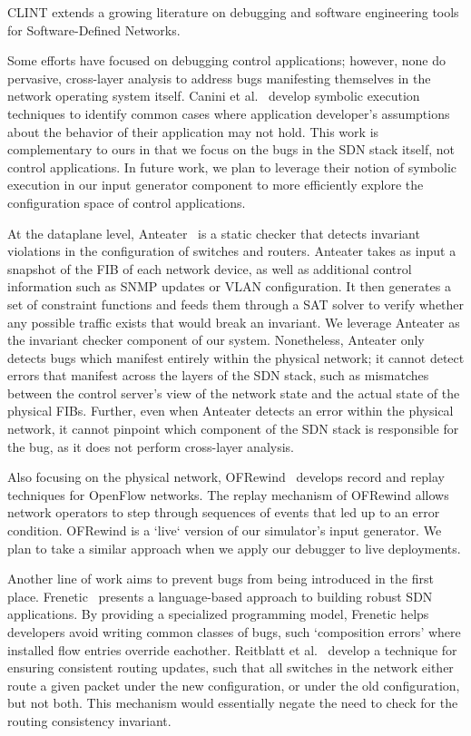 CLINT extends a growing literature on debugging and software engineering tools for Software-Defined Networks.
    
Some efforts have focused on debugging control applications; however, none do pervasive,
cross-layer analysis to address bugs manifesting themselves in the network operating system itself. 
Canini et al.~\cite{canini} develop symbolic execution techniques to identify
common cases where application developer's assumptions about the behavior of
their application may not hold. This work is complementary to ours in
that we focus on the bugs in the SDN stack itself, not control applications.
In future work, we plan to leverage their notion of symbolic execution in our
input generator component to more efficiently explore the configuration space
of control applications.

At the dataplane level, Anteater~\cite{anteater} is a static checker that
detects invariant violations in the configuration of switches and routers.
Anteater takes as input a snapshot of the FIB of each network device, as well as
additional control information such as SNMP updates or VLAN configuration. It then
generates a set of constraint functions and feeds them through a SAT solver to verify whether
any possible traffic exists that would break an invariant. We leverage
Anteater as the invariant checker component of our system.
Nonetheless, Anteater only detects bugs which manifest entirely within the physical network;  
it cannot detect errors that manifest across the layers of the SDN stack, such as mismatches
between the control server's view of the network state and the actual state of the
physical FIBs. Further, even when Anteater detects an error within the physical network, it cannot pinpoint
which component of the SDN stack is responsible for the bug, as it does not perform cross-layer
analysis. 

Also focusing on the physical network, OFRewind~\cite{ofrewind} develops record and replay techniques
for OpenFlow networks. The replay
mechanism of OFRewind allows network operators to step through sequences of
events that led up to an error condition. OFRewind is a `live` version of our
simulator's input generator. We plan to take a similar approach when we apply
our debugger to live deployments.  

Another line of work aims to prevent bugs from being introduced in the first
place. Frenetic~\cite{frenetic} presents a language-based approach to building
robust SDN applications. By providing a specialized programming model, Frenetic helps developers avoid writing common classes of
bugs, such `composition errors' where installed flow entries override eachother.
Reitblatt et al.~\cite{consistentupdates} develop a technique for ensuring
consistent routing updates, such that all switches in the network either route
a given packet under the new configuration, or under the old configuration,
but not both. This mechanism would essentially negate the need to check for
the routing consistency invariant.

